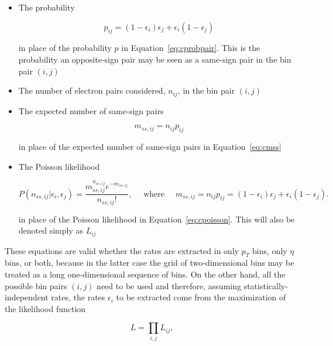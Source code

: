 \begin{itemize}
	\item The probability

	      \begin{equation}\label{eq:cijw}
		      p_{ij} = (1-\epsilon_i)\epsilon_j +  \epsilon_i(1-\epsilon_j)
	      \end{equation}

	      in place of the probability $p$ in Equation~\ref{eq:cprobpair}. This is the
	      probability an opposite-sign pair
	      may be seen as a same-sign pair in the bin pair $(i,j)$

	\item The number of electron pairs considered, $n_{ij}$,  in the bin pair $(i,j)$

	\item The expected number of same-sign pairs

	      \begin{equation}\label{eq:cmssij}
		      m_{ss,ij} = n_{ij} p_{ij}
	      \end{equation}

	      in place of the expected number of same-sign pairs in Equation~\ref{eq:cmss}


	\item The Poisson likelihood

	      \begin{equation}\label{eq:cpoissonij}
		      P(n_{ss,ij} | \epsilon_i, \epsilon_j) = \frac{m_{ss,ij}^{n_{ss,ij}} e^{-m_{ss,ij}}}{n_{ss,ij}!}
		      , \quad
		      \text{ where } \quad
		      m_{ss,ij} = n_{ij} p_{ij} = (1-\epsilon_i)\epsilon_j +  \epsilon_i(1-\epsilon_j).
	      \end{equation}

	      in place of the Poisson likelihood in Equation~\ref{eq:cpoisson}. This will also
	      be denoted simply as $L_{ij}$

\end{itemize}

These equations are valid whether the rates are extracted in only $p_T$ bins,
only $\eta$ bins, or both, because in the latter case the grid of
two-dimensional bins may be treated as a long one-dimensional sequence of bins.
On the other hand, all the possible bin pairs $(i,j)$ need to be used and
therefore, assuming statistically-independent rates, the rates $\epsilon_i$ to
be extracted come from the maximization of the likelihood function


$$
	L = \prod_{i,j}L_{ij},
$$

